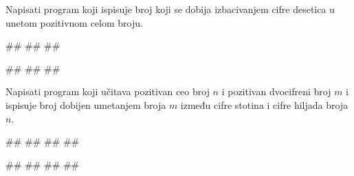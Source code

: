 \begin{Exercise}[label=UZ_NI_14] 
Napisati program koji ispisuje broj koji se dobija izbacivanjem cifre desetica u unetom pozitivnom celom broju. 

\begin{miditest}
\begin{upotreba}{1}
#\naslovInt#
##
##
\end{upotreba}
\end{miditest}
\begin{miditest}
\begin{upotreba}{2}
#\naslovInt#
##
##
\end{upotreba}
\end{miditest}

\end{Exercise}
\ifresenja
\begin{Answer}[ref=UZ_NI_14]
\end{Answer}
\fi


\begin{Exercise}[label=UZ_NI_15]
Napisati program koji učitava pozitivan ceo broj $n$ i pozitivan dvocifreni broj $m$ i ispisuje broj 
dobijen umetanjem broja $m$ između cifre stotina i cifre hiljada broja $n$. 

\begin{miditest}
\begin{upotreba}{1}
#\naslovInt#
##
##
##
\end{upotreba}
\end{miditest}  
\begin{miditest}
\begin{upotreba}{2}
#\naslovInt#
##
##
##
\end{upotreba}
\end{miditest}   

\end{Exercise}
\ifresenja
\begin{Answer}[ref=UZ_NI_15]
\end{Answer}
\fi

